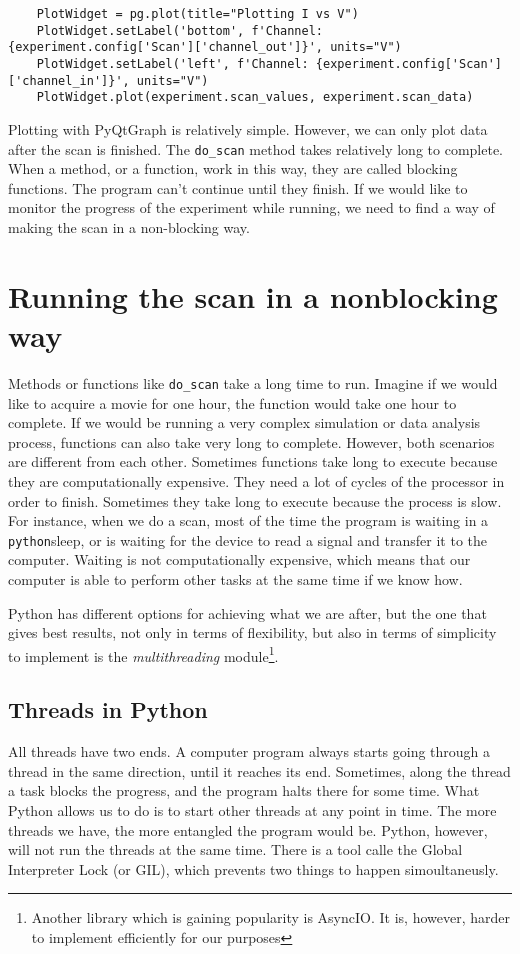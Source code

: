 \begin{verbatim}
    PlotWidget = pg.plot(title="Plotting I vs V")
    PlotWidget.setLabel('bottom', f'Channel: {experiment.config['Scan']['channel_out']}', units="V")
    PlotWidget.setLabel('left', f'Channel: {experiment.config['Scan']['channel_in']}', units="V")
    PlotWidget.plot(experiment.scan_values, experiment.scan_data)
\end{verbatim}

Plotting with PyQtGraph is relatively simple. However, we can only plot data after the scan is finished. The \texttt{do\_scan} method takes relatively long to complete. When a method, or a function, work in this way, they are called blocking functions. The program can't continue until they finish. If we would like to monitor the progress of the experiment while running, we need to find a way of making the scan in a non-blocking way.

\section{Running the scan in a nonblocking way}\label{section:nonblocking}
Methods or functions like \texttt{do\_scan} take a long time to run. Imagine if we would like to acquire a movie for one hour, the function would take one hour to complete. If we would be running a very complex simulation or data analysis process, functions can also take very long to complete. However, both scenarios are different from each other. Sometimes functions take long to execute because they are computationally expensive. They need a lot of cycles of the processor in order to finish. Sometimes they take long to execute because the process is slow. For instance, when we do a scan, most of the time the program is waiting in a \texttt{python}{sleep}, or is waiting for the device to read a signal and transfer it to the computer. Waiting is not computationally expensive, which means that our computer is able to perform other tasks at the same time if we know how.

Python has different options for achieving what we are after, but the one that gives best results, not only in terms of flexibility, but also in terms of simplicity to implement is the \emph{multithreading} module\footnote{Another library which is gaining popularity is AsyncIO. It is, however, harder to implement efficiently for our purposes}.

\subsection{Threads in Python}\label{subsection:multithreading}
All threads have two ends. A computer program always starts going through a thread in the same direction, until it reaches its end. Sometimes, along the thread a task blocks the progress, and the program halts there for some time. What Python allows us to do is to start other threads at any point in time. The more threads we have, the more entangled the program would be. Python, however, will not run the threads at the same time. There is a tool calle the Global Interpreter Lock (or GIL), which prevents two things to happen simoultaneusly.

